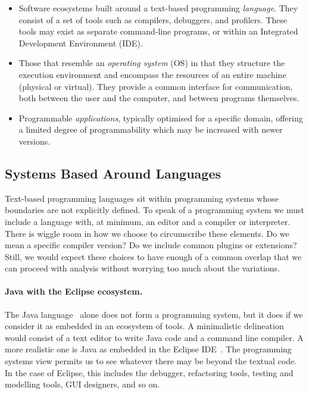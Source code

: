 \begin{itemize}
\tightlist
\item
  Software ecosystems built around a text-based programming
  \emph{language}. They consist of a set of tools such as compilers,
  debuggers, and profilers. These tools may exist as separate
  command-line programs, or within an Integrated Development Environment
  (IDE).
\item
  Those that resemble an \emph{operating system} (OS) in that they
  structure the execution environment and encompass the resources of an
  entire machine (physical or virtual). They provide a common interface
  for communication, both between the user and the computer, and between
  programs themselves.
\item
  Programmable \emph{applications}, typically optimised for a specific
  domain, offering a limited degree of programmability which may be
  increased with newer versions.
\end{itemize}


\hypertarget{systems-based-around-languages}{%
\subsection{Systems Based Around
Languages}\label{systems-based-around-languages}}

Text-based programming languages sit within programming systems whose
boundaries are not explicitly defined. To speak of a programming system
we must include a language with, at minimum, an editor and a compiler or
interpreter. There is wiggle room in how we choose to circumscribe these
elements. Do we mean a specific compiler version? Do we include common
plugins or extensions? Still, we would expect these choices to have
enough of a common overlap that we can proceed with analysis without
worrying too much about the variations.

\paragraph{Java with the Eclipse ecosystem.}

The Java language~\cite{Java} alone does not form a programming system,
but it does if we consider it as embedded in an ecosystem of tools. A
minimalistic delineation would consist of a text editor to write Java
code and a command line compiler. A more realistic one is Java as
embedded in the Eclipse IDE~\cite{Eclipse}. The programming systems view
permits us to see whatever there may be beyond the textual code. In the
case of Eclipse, this includes the debugger, refactoring tools, testing
and modelling tools, GUI designers, and so on.

